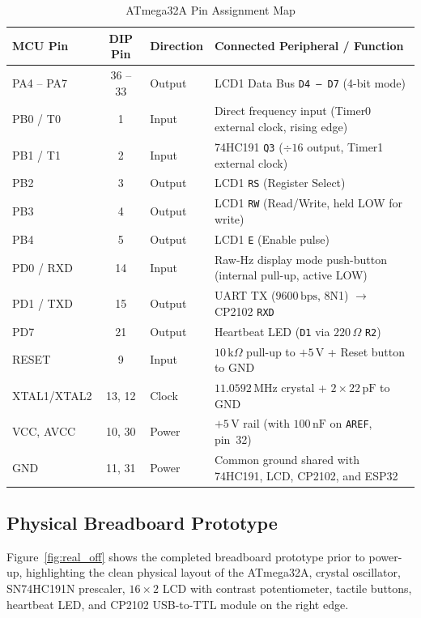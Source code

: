 \documentclass[11pt,a4paper]{article}
\begin{document}
\begin{table}[H]
\centering
\caption{ATmega32A Pin Assignment Map}
\label{tab:pinout}
\renewcommand{\arraystretch}{1.15}
\begin{tabularx}{\textwidth}{>{\ttfamily}l c l X}
\toprule
\textbf{MCU Pin} & \textbf{DIP Pin} & \textbf{Direction} & \textbf{Connected Peripheral / Function} \\
\midrule
PA4 -- PA7 & 36 -- 33 & Output & LCD1 Data Bus \texttt{D4 -- D7} (4-bit mode) \\
PB0 / T0   & 1        & Input  & Direct frequency input (Timer0 external clock, rising edge) \\
PB1 / T1   & 2        & Input  & 74HC191 \texttt{Q3} ($\div 16$ output, Timer1 external clock) \\
PB2        & 3        & Output & LCD1 \texttt{RS} (Register Select) \\
PB3        & 4        & Output & LCD1 \texttt{RW} (Read/Write, held LOW for write) \\
PB4        & 5        & Output & LCD1 \texttt{E} (Enable pulse) \\
PD0 / RXD  & 14       & Input  & Raw-Hz display mode push-button (internal pull-up, active LOW) \\
PD1 / TXD  & 15       & Output & UART TX ($9600\,\text{bps}$, 8N1) $\rightarrow$ CP2102 \texttt{RXD} \\
PD7        & 21       & Output & Heartbeat LED (\texttt{D1} via $220\,\Omega$ \texttt{R2}) \\
RESET      & 9        & Input  & $10\,\text{k}\Omega$ pull-up to $+5\,\text{V}$ + Reset button to GND \\
XTAL1/XTAL2& 13, 12   & Clock  & $11.0592\,\text{MHz}$ crystal + $2\times 22\,\text{pF}$ to GND \\
VCC, AVCC  & 10, 30   & Power  & $+5\,\text{V}$ rail (with $100\,\text{nF}$ on \texttt{AREF}, pin~32) \\
GND        & 11, 31   & Power  & Common ground shared with 74HC191, LCD, CP2102, and ESP32 \\
\bottomrule
\end{tabularx}
\end{table}

\subsection{Physical Breadboard Prototype}
Figure~\ref{fig:real_off} shows the completed breadboard prototype prior to power-up, highlighting the clean physical layout of the ATmega32A, crystal oscillator, SN74HC191N prescaler, $16\times 2$ LCD with contrast potentiometer, tactile buttons, heartbeat LED, and CP2102 USB-to-TTL module on the right edge.
\end{document}
